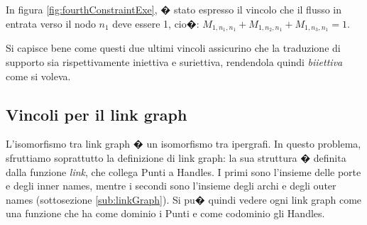 \begin{itemize}
\begin{figure*}[th]
	\caption{Esempio per il vincolo sul flusso in entrata \label{fig:fourthConstraintExe}}
	\end{figure*}
	In figura \ref{fig:fourthConstraintExe}, � stato espresso il vincolo che il flusso in entrata verso il nodo $n_1$ deve essere 1, cio�: 
	$M_{1,n_1,n_1}+M_{1,n_2,n_1}+M_{1,n_3,n_1}=1$.
	
\end{itemize}

Si capisce bene come questi due ultimi vincoli assicurino che la traduzione di supporto sia rispettivamente iniettiva e suriettiva, rendendola quindi \emph{biiettiva} come si voleva.



\subsection{Vincoli per il link graph}
L'isomorfismo tra link graph � un isomorfismo tra ipergrafi. In questo problema, sfruttiamo soprattutto la definizione di link graph: la sua struttura � definita dalla funzione \emph{link}, che collega Punti a Handles. I primi sono l'insieme delle porte e degli inner names, mentre i secondi sono l'insieme degli archi e degli outer names (sottosezione \ref{sub:linkGraph}). Si pu� quindi vedere ogni link graph come una funzione che ha come dominio i Punti e come codominio gli Handles. 

